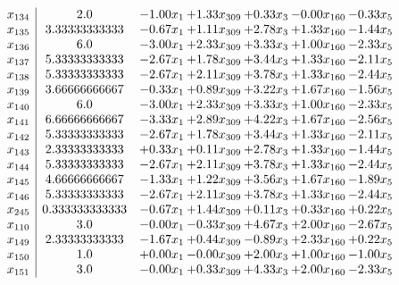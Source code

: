 \documentclass[8pt]{article}
\begin{document}
\[\begin{array}{c| c c@{\hskip 2pt} c@{\hskip 2pt} c@{\hskip 2pt} c@{\hskip 2pt} c@{\hskip 2pt} }
 x_{134}   &  2.0 & -1.00 x_{1} & +  1.33 x_{309} & +  0.33 x_{3} & -0.00 x_{160} & -0.33 x_{5}\\
 x_{135}   &  3.33333333333 & -0.67 x_{1} & +  1.11 x_{309} & +  2.78 x_{3} & +  1.33 x_{160} & -1.44 x_{5}\\
 x_{136}   &  6.0 & -3.00 x_{1} & +  2.33 x_{309} & +  3.33 x_{3} & +  1.00 x_{160} & -2.33 x_{5}\\
 x_{137}   &  5.33333333333 & -2.67 x_{1} & +  1.78 x_{309} & +  3.44 x_{3} & +  1.33 x_{160} & -2.11 x_{5}\\
 x_{138}   &  5.33333333333 & -2.67 x_{1} & +  2.11 x_{309} & +  3.78 x_{3} & +  1.33 x_{160} & -2.44 x_{5}\\
 x_{139}   &  3.66666666667 & -0.33 x_{1} & +  0.89 x_{309} & +  3.22 x_{3} & +  1.67 x_{160} & -1.56 x_{5}\\
 x_{140}   &  6.0 & -3.00 x_{1} & +  2.33 x_{309} & +  3.33 x_{3} & +  1.00 x_{160} & -2.33 x_{5}\\
 x_{141}   &  6.66666666667 & -3.33 x_{1} & +  2.89 x_{309} & +  4.22 x_{3} & +  1.67 x_{160} & -2.56 x_{5}\\
 x_{142}   &  5.33333333333 & -2.67 x_{1} & +  1.78 x_{309} & +  3.44 x_{3} & +  1.33 x_{160} & -2.11 x_{5}\\
 x_{143}   &  2.33333333333 & +  0.33 x_{1} & +  0.11 x_{309} & +  2.78 x_{3} & +  1.33 x_{160} & -1.44 x_{5}\\
 x_{144}   &  5.33333333333 & -2.67 x_{1} & +  2.11 x_{309} & +  3.78 x_{3} & +  1.33 x_{160} & -2.44 x_{5}\\
 x_{145}   &  4.66666666667 & -1.33 x_{1} & +  1.22 x_{309} & +  3.56 x_{3} & +  1.67 x_{160} & -1.89 x_{5}\\
 x_{146}   &  5.33333333333 & -2.67 x_{1} & +  2.11 x_{309} & +  3.78 x_{3} & +  1.33 x_{160} & -2.44 x_{5}\\
 x_{245}   &  0.333333333333 & -0.67 x_{1} & +  1.44 x_{309} & +  0.11 x_{3} & +  0.33 x_{160} & +  0.22 x_{5}\\
 x_{110}   &  3.0 & -0.00 x_{1} & -0.33 x_{309} & +  4.67 x_{3} & +  2.00 x_{160} & -2.67 x_{5}\\
 x_{149}   &  2.33333333333 & -1.67 x_{1} & +  0.44 x_{309} & -0.89 x_{3} & +  2.33 x_{160} & +  0.22 x_{5}\\
 x_{150}   &  1.0 & +  0.00 x_{1} & -0.00 x_{309} & +  2.00 x_{3} & +  1.00 x_{160} & -1.00 x_{5}\\
 x_{151}   &  3.0 & -0.00 x_{1} & +  0.33 x_{309} & +  4.33 x_{3} & +  2.00 x_{160} & -2.33 x_{5}\\

\end{array}\]
\end{document}
